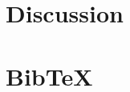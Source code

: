 \documentclass[12pt]{article}
\begin{document}
\section{Discussion}
%





%
\section{BibTeX}

 
 		
\end{document}
